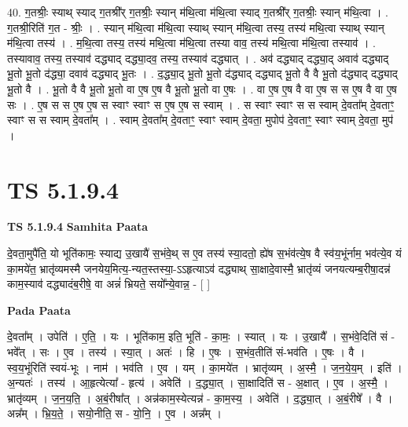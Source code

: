 \documentclass[17pt]{extarticle}
\begin{document}
40. ग॒तश्रीः॒ स्याथ् स्याद् ग॒तश्री᳚र् ग॒तश्रीः॒ स्यान् म॑थि॒त्वा म॑थि॒त्वा स्याद् ग॒तश्री᳚र् ग॒तश्रीः॒ स्यान् म॑थि॒त्वा । . ग॒तश्री॒रिति॑ ग॒त - श्रीः॒ । . स्यान् म॑थि॒त्वा म॑थि॒त्वा स्याथ् स्यान् म॑थि॒त्वा तस्य॒ तस्य॑ मथि॒त्वा स्याथ् स्यान् म॑थि॒त्वा तस्य॑ । . म॒थि॒त्वा तस्य॒ तस्य॑ मथि॒त्वा म॑थि॒त्वा तस्या वाव॒ तस्य॑ मथि॒त्वा म॑थि॒त्वा तस्याव॑ । . तस्यावाव॒ तस्य॒ तस्याव॑ दद्ध्याद् दद्ध्या॒दव॒ तस्य॒ तस्याव॑ दद्ध्यात् । . अव॑ दद्ध्याद् दद्ध्या॒द् अवाव॑ दद्ध्याद् भू॒तो भू॒तो द॑द्ध्या॒ दवाव॑ दद्ध्याद् भू॒तः । . द॒द्ध्या॒द् भू॒तो भू॒तो द॑द्ध्याद् दद्ध्याद् भू॒तो वै वै भू॒तो द॑द्ध्याद् दद्ध्याद् भू॒तो वै । . भू॒तो वै वै भू॒तो भू॒तो वा ए॒ष ए॒ष वै भू॒तो भू॒तो वा ए॒षः । . वा ए॒ष ए॒ष वै वा ए॒ष स स ए॒ष वै वा ए॒ष सः । . ए॒ष स स ए॒ष ए॒ष स स्वाꣳ स्वाꣳ स ए॒ष ए॒ष स स्वाम् । . स स्वाꣳ स्वाꣳ स स स्वाम् दे॒वता᳚म् दे॒वताꣳ॒॒ स्वाꣳ स स स्वाम् दे॒वता᳚म् । . स्वाम् दे॒वता᳚म् दे॒वताꣳ॒॒ स्वाꣳ स्वाम् दे॒वता॒ मुपोप॑ दे॒वताꣳ॒॒ स्वाꣳ स्वाम् दे॒वता॒ मुप॑ । \newline
\pagebreak
{}

\section{ TS 5.1.9.4 }

\textbf{TS 5.1.9.4 } \newline
\textbf{Samhita Paata} \newline

दे॒वता॒मुपै॑ति॒ यो भूति॑कामः॒ स्याद्य उ॒खायै॑ स॒भंवे॒थ् स ए॒व तस्य॑ स्या॒दतो॒ ह्ये॑ष स॒भंव॑त्ये॒ष वै स्व॑य॒भूंर्नाम॒ भव॑त्ये॒व यं का॒मये॑त॒ भ्रातृ॑व्यमस्मै जनयेय॒मित्य॒-न्यत॒स्तस्या॒-ऽऽहृत्याऽव॑ दद्ध्याथ् सा॒क्षादे॒वास्मै॒ भ्रातृ॑व्यं जनयत्यम्ब॒रीषा॒दन्न॑ काम॒स्याव॑ दद्ध्यादंब॒रीषे॒ वा अन्नं॑ भ्रियते॒ सयो᳚न्ये॒वान्न॒ - [  ] \newline

\textbf{Pada Paata} \newline

दे॒वता᳚म् । उपेति॑ । ए॒ति॒ । यः । भूति॑काम॒ इति॒ भूति॑ - का॒मः॒ । स्यात् । यः । उ॒खायै᳚ । स॒भंवे॒दिति॑ सं - भवे᳚त् । सः । ए॒व । तस्य॑ । स्या॒त् । अतः॑ । हि । ए॒षः । स॒भंव॒तीति॑ सं-भव॑ति । ए॒षः । वै । स्व॒य॒भूंरिति॑ स्वयं-भूः । नाम॑ । भव॑ति । ए॒व । यम् । का॒मये॑त । भ्रातृ॑व्यम् । अ॒स्मै॒ । ज॒न॒ये॒य॒म् । इति॑ । अ॒न्यतः॑ । तस्य॑ । आ॒हृत्येत्या᳚ - हृत्य॑ । अवेति॑ । द॒द्ध्या॒त् । सा॒क्षादिति॑ स - अ॒क्षात् । ए॒व । अ॒स्मै॒ । भ्रातृ॑व्यम् । ज॒न॒य॒ति॒ । अ॒बं॒रीषा᳚त् । अन्न॑काम॒स्येत्यन्न॑ - का॒म॒स्य॒ । अवेति॑ । द॒द्ध्या॒त् । अ॒बं॒रीषे᳚ । वै । अन्न᳚म् । भ्रि॒य॒ते॒ । सयो॒नीति॒ स - यो॒नि॒ । ए॒व । अन्न᳚म् ।  \newline
\end{document}
